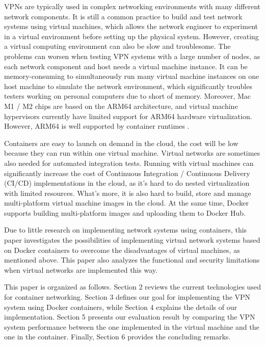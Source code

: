 \documentclass[article]{aaltoseries}
\begin{document}
VPNs are typically used in complex networking environments with many different network components. It is still a common practice \cite{9151942} to build and test network systems using virtual machines, which allows the network engineer to experiment in a virtual environment before setting up the physical system. However, creating a virtual computing environment can also be slow and troublesome. The problems can worsen when testing VPN systems with a large number of nodes, as each network component and host needs a virtual machine instance. It can be memory-consuming to simultaneously run many virtual machine instances on one host machine to simulate the network environment, which significantly troubles testers working on personal computers due to short of memory. Moreover, Mac M1 / M2 chips are based on the ARM64 architecture, and virtual machine hypervisors currently have limited support for ARM64 hardware virtualization. However, ARM64 is well supported by container runtimes \cite{9852232}.

Containers are easy to launch on demand in the cloud, the cost will be low because they can run within one virtual machine. Virtual networks are sometimes also needed for automated integration tests. Running with virtual machines can significantly increase the cost of Continuous Integration / Continuous Delivery (CI/CD) implementations in the cloud, as it's hard to do nested virtualization with limited resources. What's more, it is also hard to build, store and manage multi-platform virtual machine images in the cloud. At the same time, Docker supports building multi-platform images \cite{dockermultiplatform} and uploading them to Docker Hub.

Due to little research on implementing network systems using containers, this paper investigates the possibilities of implementing virtual network systems based on Docker containers to overcome the disadvantages of virtual machines, as mentioned above. This paper also analyzes the functional and security limitations when virtual networks are implemented this way.

This paper is organized as follows. Section 2 reviews the current technologies used for container networking. Section 3 defines our goal for implementing the VPN system using Docker containers, while Section 4 explains the details of our implementation. Section 5 presents our evaluation result by comparing the VPN system performance between the one implemented in the virtual machine and the one in the container. Finally, Section 6 provides the concluding remarks.
\end{document}
